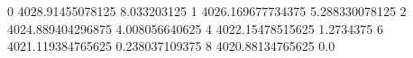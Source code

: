 0 4028.91455078125 8.033203125
1 4026.169677734375 5.288330078125
2 4024.889404296875 4.008056640625
4 4022.15478515625 1.2734375
6 4021.119384765625 0.238037109375
8 4020.88134765625 0.0
